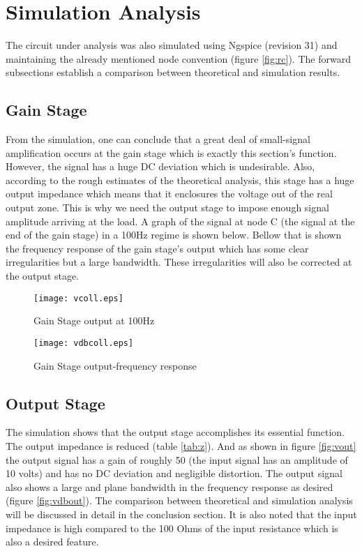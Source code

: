 \section{Simulation Analysis}
\label{sec:simulation}

The circuit under analysis was also simulated using Ngspice (revision 31) and maintaining the already mentioned node convention (figure \ref{fig:rc}). The forward subsections establish a comparison between theoretical and simulation results.

\subsection{Gain Stage}
From the simulation, one can conclude that a great deal of small-signal amplification occurs at the gain stage which is exactly this section's function. However, the signal has a huge DC deviation which is undesirable. Also, according to the rough estimates of the theoretical analysis, this stage has a huge output impedance which means that it enclosures the voltage out of the real output zone. This is why we need the output stage to impose enough signal amplitude arriving at the load. A graph of the signal at node C (the signal at the end of the gain stage) in a 100Hz regime is shown below. Bellow that is shown the frequency response of the gain stage's output which has some clear irregularities but a large bandwidth. These irregularities will also be corrected at the output stage.

\begin{figure}[h] \centering
\texttt{[image: vcoll.eps]}
\vspace{-5mm}
\caption{Gain Stage output at 100Hz}
\label{fig:vcoll}
\end{figure}

\begin{figure}[h] \centering
\texttt{[image: vdbcoll.eps]}
\vspace{-5mm}
\caption{Gain Stage output-frequency response}
\label{fig:vdbcoll}
\end{figure}

\newpage
\subsection{Output Stage}

The simulation shows that the output stage accomplishes its essential function. The output impedance is reduced (table \ref{tab:z}). And as shown in figure \ref{fig:vout} the output signal has a gain of roughly 50 (the input signal has an amplitude of 10 volts) and has no DC deviation and negligible distortion. The output signal also shows a large and plane bandwidth in the frequency response as desired (figure \ref{fig:vdbout}). The comparison between theoretical and simulation analysis will be discussed in detail in the conclusion section. It is also noted that the input impedance is high compared to the 100 Ohms of the input resistance which is also a desired feature.

